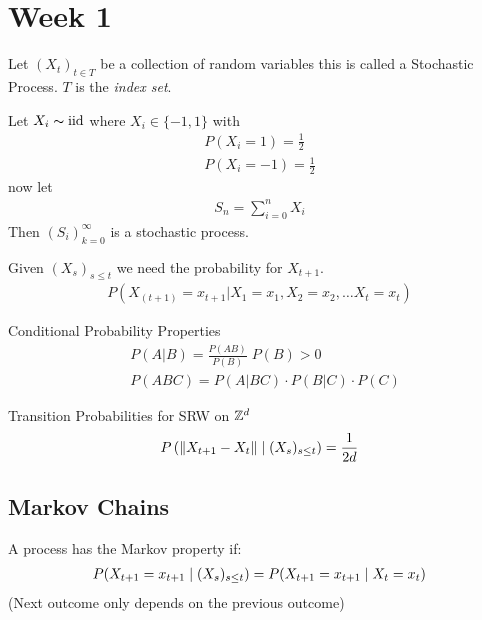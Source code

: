 \documentclass[12pt,a4paper]{article}
\begin{document}
\section{Week 1}
\begin{defn}
Let $(X_t)_{t\in T}$ be a collection of random variables this is called a Stochastic Process. $T$ is the \textit{index set}. 
\end{defn}
\begin{example}
Let $X_i\thicksim \mathrm{iid}$ where $X_i \in \{-1,1\}$ with 
\begin{align*}
P(X_i = 1) = \frac{1}{2}\\
P(X_i = -1) = \frac{1}{2}
\end{align*}
now let 
\begin{align*}
S_n = \sum_{i=0}^n X_i
\end{align*}
Then $(S_i)_{k=0}^\infty$ is a stochastic process.  
\end{example}

\begin{defn}
Given $(X_s)_{s \leq t}$ we need the probability for $X_{t+1}$.
\begin{align*}
P(X_{(t+1)} = x_{t+1} \vert X_1 = x_1 , X_2 = x_2, \ldots X_t = x_t)
\end{align*}
\end{defn}


\begin{note}{Conditional Probability Properties}
\begin{align*}
&P(A | B) = \frac{P(AB)}{P(B)} \; P(B) > 0\\
&P(ABC) = P(A|BC) \cdot P(B|C) \cdot P(C)
\end{align*}
\end{note}

\begin{example}{Transition Probabilities for SRW on $\mathbb{Z}^d$}
\begin{align*}
P\left(\norm{X_{t+1} - X_{t}} \;\vert\; (X_{s})_{s \leq t} \right) = \frac{1}{2d} 
\end{align*}
\end{example}
\newpage
\subsection{Markov Chains}
\begin{defn}
\label{markovprop}
A process has the Markov property if:
\begin{align*}
P(X_{t+1}= x_{t+1} \;\vert\; (X_{s})_{s\leq t}) = P(X_{t+1} = x_{t+1} \;\vert\; X_{t} = x_t)
\end{align*}
(Next outcome only depends on the previous outcome)
\end{defn}
\end{document}
